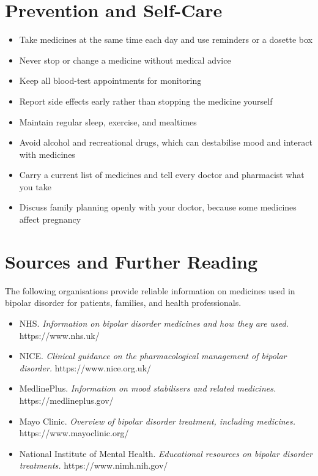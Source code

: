 \section*{Prevention and Self-Care}
\begin{itemize}
    \item Take medicines at the same time each day and use reminders or a dosette box
    \item Never stop or change a medicine without medical advice
    \item Keep all blood-test appointments for monitoring
    \item Report side effects early rather than stopping the medicine yourself
    \item Maintain regular sleep, exercise, and mealtimes
    \item Avoid alcohol and recreational drugs, which can destabilise mood and interact with medicines
    \item Carry a current list of medicines and tell every doctor and pharmacist what you take
    \item Discuss family planning openly with your doctor, because some medicines affect pregnancy
\end{itemize}

\section*{Sources and Further Reading}
The following organisations provide reliable information on medicines used in bipolar disorder for patients, families, and health professionals.

\begin{itemize}
    \item NHS. \textit{Information on bipolar disorder medicines and how they are used.} https://www.nhs.uk/
    \item NICE. \textit{Clinical guidance on the pharmacological management of bipolar disorder.} https://www.nice.org.uk/
    \item MedlinePlus. \textit{Information on mood stabilisers and related medicines.} https://medlineplus.gov/
    \item Mayo Clinic. \textit{Overview of bipolar disorder treatment, including medicines.} https://www.mayoclinic.org/
    \item National Institute of Mental Health. \textit{Educational resources on bipolar disorder treatments.} https://www.nimh.nih.gov/
\end{itemize}
